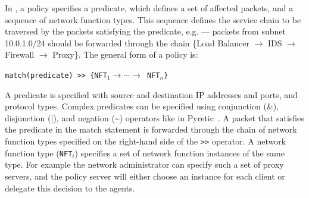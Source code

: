 

In  \system,  a
policy  specifies a  predicate,  which defines a set of affected
packets, and a  sequence of network  function types.  This sequence defines the service  chain to be  traversed by the packets  satisfying the predicate, e.g. --- packets from subnet 10.0.1.0/24
should    be     forwarded       through      the     chain     \{Load
Balancer $\rightarrow$ IDS $\rightarrow$ Firewall $\rightarrow$ Proxy\}.    The general form
of a policy is:
\begin{center}
{\tt match(predicate) >> \{NFT$_1 \rightarrow\cdots\rightarrow$ NFT$_n$\}}
\end{center}
A predicate is specified with source and  destination IP addresses and
ports, and protocol types.   Complex predicates can be specified using
conjunction (\&),  disjunction  ($|$),  and negation (\~{})  operators
like in Pyretic~\cite{pyretic}. A packet that satisfies  the predicate in the
match  statement is forwarded  through  the chain of network  function
types specified  on the right-hand side of  the  {\tt >>} operator.  A
network   function type ({\tt NFT$_i$})   specifies  a set of  network
function instances  of the same  type. For example the network  administrator can
specify such a set of proxy servers, and
the policy  server will either choose an instance for each client or  delegate   this  decision to  the \system
agents.



